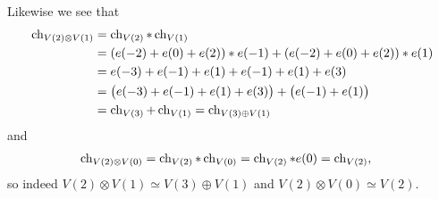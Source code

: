 Likewise we see that
\begin{align*}
  \operatorname{ch}_{V(2)\otimes V(1)} &= \operatorname{ch}_{V(2)}*\operatorname{ch}_{V(1)} \\
  &= (e(-2)+e(0)+e(2))*e(-1) + (e(-2)+e(0)+e(2))*e(1) \\
                         &= e(-3)+e(-1)+e(1)+e(-1)+e(1)+e(3) \\
                         &= \bigl(e(-3)+e(-1)+e(1)+e(3)\bigr) + \bigl(e(-1)+e(1)\bigr) \\
  &= \operatorname{ch}_{V(3)} + \operatorname{ch}_{V(1)} = \operatorname{ch}_{V(3)\oplus V(1)}
\end{align*}
and
\begin{align*}
  \operatorname{ch}_{V(2)\otimes V(0)} &= \operatorname{ch}_{V(2)}*\operatorname{ch}_{V(0)} = \operatorname{ch}_{V(2)}*e(0) = \operatorname{ch}_{V(2)},
\end{align*}
so indeed $V(2)\otimes V(1)\simeq V(3)\oplus V(1)$ and $V(2)\otimes V(0)\simeq V(2)$. 

